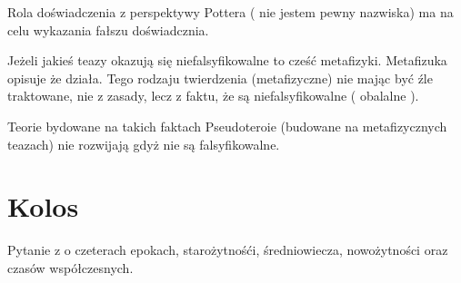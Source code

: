 \documentclass[11pt]{article}
\begin{document}
Rola doświadczenia z perspektywy Pottera ( nie jestem pewny nazwiska) ma na celu wykazania fałszu doświadcznia.

Jeżeli jakieś teazy okazują się niefalsyfikowalne to cześć metafizyki. Metafizuka opisuje że działa. Tego rodzaju twierdzenia (metafizyczne) nie mając być źle traktowane, nie z zasady, lecz z faktu, że są niefalsyfikowalne ( obalalne ).

Teorie bydowane na takich faktach
Pseudoteroie (budowane na metafizycznych teazach) nie rozwijają gdyż nie są falsyfikowalne.

\section{Kolos}
Pytanie z o czeterach epokach, starożytnośći, średniowiecza, nowożytności oraz czasów współczesnych.
\end{document}
